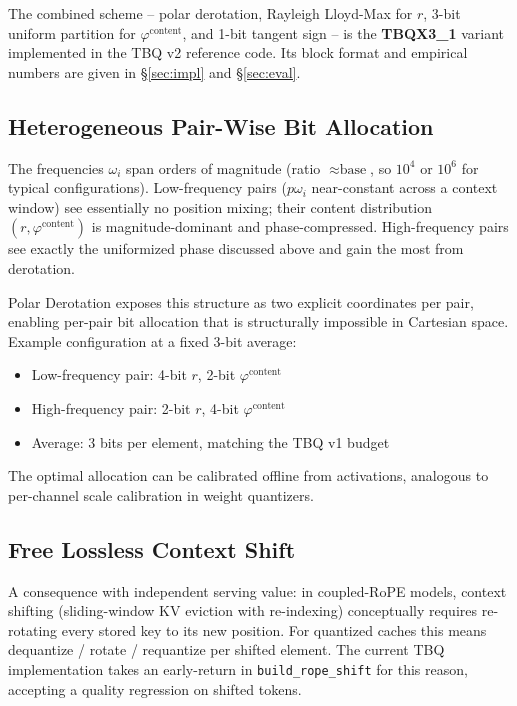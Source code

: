 \documentclass[10pt,twocolumn]{article}
\begin{document}
The combined scheme -- polar derotation, Rayleigh Lloyd-Max for $r$, 3-bit uniform partition for $\varphi^{\text{content}}$, and 1-bit tangent sign -- is the \textbf{TBQX3\_1} variant implemented in the TBQ v2 reference code. Its block format and empirical numbers are given in \S\ref{sec:impl} and \S\ref{sec:eval}.

\subsection{Heterogeneous Pair-Wise Bit Allocation}
\label{sec:hetero}

The frequencies $\omega_i$ span orders of magnitude (ratio $\approx\text{base}$, so $10^4$ or $10^6$ for typical configurations). Low-frequency pairs ($p\omega_i$ near-constant across a context window) see essentially no position mixing; their content distribution $(r,\varphi^{\text{content}})$ is magnitude-dominant and phase-compressed. High-frequency pairs see exactly the uniformized phase discussed above and gain the most from derotation.

Polar Derotation exposes this structure as two explicit coordinates per pair, enabling per-pair bit allocation that is structurally impossible in Cartesian space. Example configuration at a fixed 3-bit average:
\begin{itemize}[leftmargin=*,topsep=1pt,itemsep=0pt]
\item Low-frequency pair: 4-bit $r$, 2-bit $\varphi^{\text{content}}$
\item High-frequency pair: 2-bit $r$, 4-bit $\varphi^{\text{content}}$
\item Average: 3 bits per element, matching the TBQ v1 budget
\end{itemize}
The optimal allocation can be calibrated offline from activations, analogous to per-channel scale calibration in weight quantizers.

\subsection{Free Lossless Context Shift}
\label{sec:shift}

A consequence with independent serving value: in coupled-RoPE models, context shifting (sliding-window KV eviction with re-indexing) conceptually requires re-rotating every stored key to its new position. For quantized caches this means dequantize / rotate / requantize per shifted element. The current TBQ implementation takes an early-return in \texttt{build\_rope\_shift} for this reason, accepting a quality regression on shifted tokens.
\end{document}
